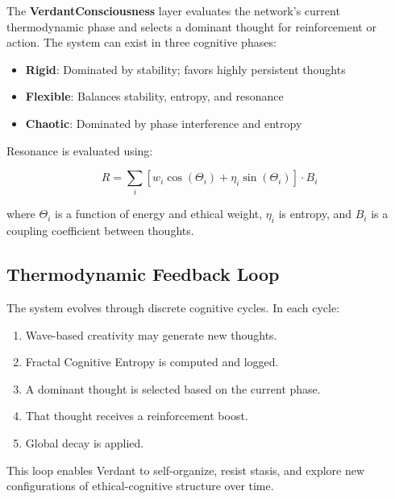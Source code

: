 \documentclass{article}
\begin{document}
The \textbf{VerdantConsciousness} layer evaluates the network’s current thermodynamic phase and selects a dominant thought for reinforcement or action. The system can exist in three cognitive phases:

\begin{itemize}
    \item \textbf{Rigid}: Dominated by stability; favors highly persistent thoughts
    \item \textbf{Flexible}: Balances stability, entropy, and resonance
    \item \textbf{Chaotic}: Dominated by phase interference and entropy
\end{itemize}

Resonance is evaluated using:

\begin{equation}
R = \sum_i \left[ w_i \cos(\Theta_i) + \eta_i \sin(\Theta_i) \right] \cdot B_i
\end{equation}

\noindent where $\Theta_i$ is a function of energy and ethical weight, $\eta_i$ is entropy, and $B_i$ is a coupling coefficient between thoughts.

\subsection{Thermodynamic Feedback Loop}

The system evolves through discrete cognitive cycles. In each cycle:

\begin{enumerate}
    \item Wave-based creativity may generate new thoughts.
    \item Fractal Cognitive Entropy is computed and logged.
    \item A dominant thought is selected based on the current phase.
    \item That thought receives a reinforcement boost.
    \item Global decay is applied.
\end{enumerate}

This loop enables Verdant to self-organize, resist stasis, and explore new configurations of ethical-cognitive structure over time.
\end{document}
